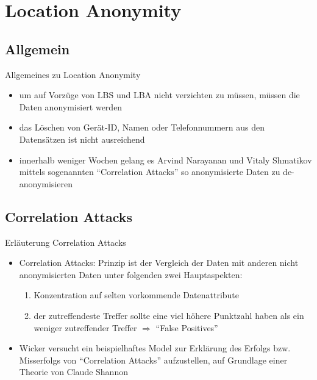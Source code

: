 \section{Location Anonymity}
\subsection{Allgemein}
\begin{frame}{Allgemeines zu Location Anonymity}
\begin{itemize}
  \item um auf Vorzüge von LBS und LBA nicht verzichten zu müssen, müssen die Daten anonymisiert werden
  \item das Löschen von Gerät-ID, Namen oder Telefonnummern aus den Datensätzen ist nicht ausreichend
  \item innerhalb weniger Wochen gelang es Arvind Narayanan und Vitaly Shmatikov mittels sogenannten "`Correlation Attacks"' so anonymisierte Daten zu de-anonymisieren
\end{itemize}
\end{frame}

\subsection{Correlation Attacks}
\begin{frame}{Erläuterung Correlation Attacks}
\begin{itemize}
  \item Correlation Attacks: Prinzip ist der Vergleich der Daten mit anderen nicht anonymisierten Daten unter folgenden zwei Hauptaspekten:
  \begin{enumerate}
  \item Konzentration auf selten vorkommende Datenattribute
  \item der zutreffendeste Treffer sollte eine viel höhere Punktzahl haben als ein weniger zutreffender Treffer $\Rightarrow$ "`False Positives"'
  \end{enumerate}
  \item Wicker versucht ein beispielhaftes Model zur Erklärung des Erfolgs bzw. Misserfolgs von "`Correlation Attacks"' aufzustellen, auf Grundlage einer Theorie von Claude Shannon
\end{itemize}
\end{frame}

